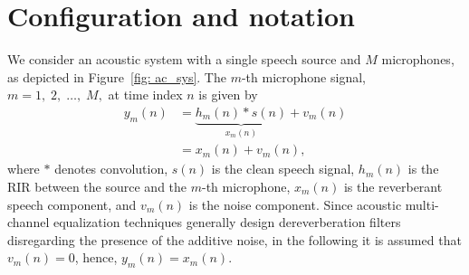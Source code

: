 \documentclass[twocolumn]{bmcart}%
\begin{document}
\section{Configuration and notation}
\label{sec: conf}
We consider an acoustic system with a single speech source and $M$ microphones, as depicted in Figure~\ref{fig: ac_sys}.
The $m$-th microphone signal, $m = 1, \; 2, \; \ldots, \; M,$ at time index $n$ is given by
\begin{align}
  y_m(n) &= \underbrace{h_m(n) \ast s(n)}_{x_m(n)} + v_m(n)  \\
  & = x_m(n) + v_m(n),
\end{align}
where $\ast$ denotes convolution, $s(n)$ is the clean speech signal, $h_m(n)$ is the RIR between the source and the $m$-th microphone, $x_{m}(n)$ is the reverberant speech component, and $v_{m}(n)$ is the noise component.
Since acoustic multi-channel equalization techniques generally design dereverberation filters disregarding the presence of the additive noise, in the following it is assumed that $v_m(n) = 0$, hence, $y_m(n) = x_m(n)$.
\end{document}
